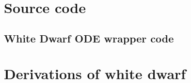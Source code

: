 \documentclass[]{article}
\begin{document}
	
	

\appendix
\section{Source code}\label{app:source-code}
\subsection{White Dwarf ODE wrapper code}\label{subapp:WDODEwrapper}
\section{Derivations of white dwarf}\label{app:WD-derivations}
\end{document}

